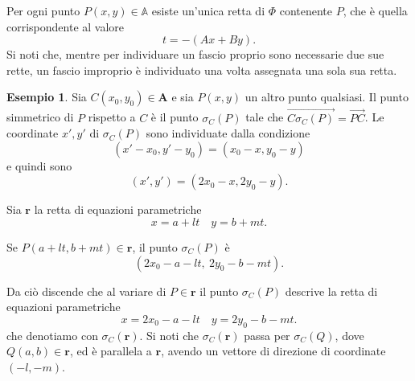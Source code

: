 \documentclass{article}
\theoremstyle{plain}
\theoremstyle{definition}
\newtheorem{exmp}{Esempio}[section]
\theoremstyle{remark}
\begin{document}
\vspace{10pt}

Per ogni punto $P(x, y) \in \mathbb{A}$ esiste un'unica retta di $\Phi$ contenente $P$, che è quella
corrispondente al valore
\[
t = -(Ax + By).
\]
Si noti che, mentre per individuare un fascio proprio sono necessarie due sue rette, un fascio improprio è individuato una volta assegnata una sola sua retta.

\vspace{10pt}

\begin{exmp}
Sia $C(x_0, y_0) \in \mathbf{A}$ e sia $P(x, y)$ un altro punto qualsiasi. Il punto simmetrico di $P$ rispetto a $C$ è il punto $\sigma_C(P)$ tale che $\overrightarrow{C\sigma_C(P)} = \overrightarrow{PC}$. Le coordinate $x', y'$ di $\sigma_C(P)$ sono individuate dalla condizione
\[(x' - x_0, y' - y_0) = (x_0 - x, y_0 - y)\]
e quindi sono
\[(x', y') = (2x_0 - x, 2y_0 - y).\]

Sia $\mathbf{r}$ la retta di equazioni parametriche
\[x = a + lt \quad y = b + mt.\]

Se $P(a + lt, b + mt) \in\mathbf{r}$, il punto $\sigma_C(P)$ è
\[(2x_0 - a - lt,\ 2y_0 - b - mt).\]

Da ciò discende che al variare di $P \in \mathbf{r}$ il punto $\sigma_C(P)$ descrive la retta di equazioni parametriche
\[x = 2x_0 - a - lt \quad y = 2y_0 - b - mt.\]
che denotiamo con $\sigma_C(\mathbf{r})$. Si noti che $\sigma_C(\mathbf{r})$ passa per $\sigma_C(Q)$, dove $Q(a, b)\in\mathbf{r}$, ed è parallela a $\mathbf{r}$, avendo un vettore di direzione di coordinate $(-l, -m)$.    
\end{exmp}

\vspace{10pt}
\end{document}
